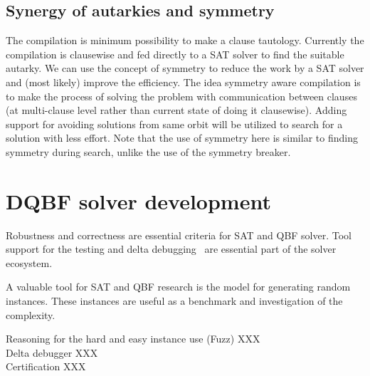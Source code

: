 \documentclass[conference]{IEEEtran}
\begin{document}

\subsection{Synergy of autarkies and symmetry}
The compilation is minimum possibility to make a clause tautology. 
%
Currently the compilation is clausewise and fed directly to a SAT solver to find the suitable autarky.
%
We can use the concept of symmetry to reduce the work by a SAT solver and (most likely) improve the efficiency.
%
The idea symmetry aware compilation is to make the process of solving the problem with communication between clauses (at multi-clause level rather than current state of doing it clausewise).
%
Adding support for avoiding solutions from same orbit will be utilized to search for a solution with less effort.
%
Note that the use of symmetry here is similar to finding symmetry during search, unlike the use of the symmetry breaker. 
 

\section{DQBF solver development}
\label{sec:dev}

Robustness and correctness are essential criteria for SAT and
QBF solver.
%
Tool support for the testing and delta debugging~\cite{brummayer2010automated} are essential part of the solver ecosystem.
%

%
A valuable tool for SAT and QBF research is the model for
generating random instances. These instances are useful as a benchmark and investigation of the complexity.

Reasoning for the hard and easy instance use (Fuzz) XXX \\

Delta debugger XXX \\

Certification XXX
\end{document}
